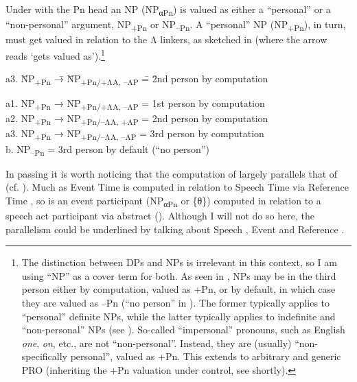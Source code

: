 \documentclass[output=paper]{LSP/langsci}
\begin{document}
Under  with the Pn head an NP (NP\textsubscript{α}\textsubscript{Pn}) is valued as either a “personal” or a “non-personal” argument, NP\textsubscript{+Pn} or NP\textsubscript{–Pn}. A “personal” NP (NP\textsubscript{+Pn}), in turn, must get valued in relation to the Λ linkers, as sketched in  (where the arrow reads ‘gets valued as’).\footnote{The distinction between DPs and NPs is irrelevant in this context, so I am using “NP” as a cover term for both. As seen in , NPs may be in the third person either by computation, valued as +Pn, or by default, in which case they are valued as –Pn (“no person” in \citealt{Benveniste1966}). The former typically applies to “personal” definite NPs, while the latter typically applies to indefinite and “non-personal” NPs (see \citealt[168–169]{Sigurðsson2010epp}). So-called “impersonal” pronouns, such as English \textit{one},  \textit{on}, etc., are not “non-personal”. Instead, they are (usually) “non-specifically personal”, valued as +Pn. This extends to arbitrary and generic PRO (inheriting the +Pn valuation under control, see shortly).}

\ea%
    \label{ex:Sigurdsson:29}
  \begin{tabbing}
   a3. \= NP\textsubscript{+Pn} \= → \= NP\textsubscript{+Pn/+ΛA, –ΛP} \= = \= 2nd person by computation \kill

  a1. \>  NP\textsubscript{+Pn} \> → \> NP\textsubscript{+Pn/+ΛA, –ΛP} \> = \> 1st person by computation\\
  a2. \>  NP\textsubscript{+Pn} \> → \> NP\textsubscript{+Pn/–ΛA, +ΛP} \> = \> 2nd person by computation\\
  a3. \>  NP\textsubscript{+Pn} \> → \> NP\textsubscript{+Pn/–ΛA, –ΛP} \> = \> 3rd person by computation\\
  b.  \>  NP\textsubscript{–Pn} \>   \>                                \> = \> 3rd person by default  (“no person”)
  \end{tabbing}

\z

In passing it is worth noticing that the computation of  largely parallels that of  (cf. \citealt{Partee1973}). Much as Event Time is computed in relation to Speech Time via Reference Time \citep{Reichenbach1947}, so is an event participant (NP\textsubscript{α}\textsubscript{Pn} or \{θ\}) computed in relation to a speech act participant via abstract  (\citealt{Sigurðsson2004,Sigurðsson2016}). Although I will not do so here, the parallelism could be underlined by talking about Speech , Event  and Reference .
\end{document}
